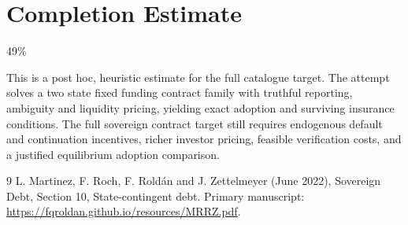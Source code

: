 \documentclass[11pt]{article}
\begin{document}
\section{Completion Estimate}
49\%

This is a post hoc, heuristic estimate for the full catalogue target.
The attempt solves a two state fixed funding contract family with truthful reporting, ambiguity and liquidity pricing, yielding exact adoption and surviving insurance conditions. The full sovereign contract target still requires endogenous default and continuation incentives, richer investor pricing, feasible verification costs, and a justified equilibrium adoption comparison.

\begin{thebibliography}{9}
 L. Martinez, F. Roch, F. Rold\'an and J. Zettelmeyer (June 2022), Sovereign Debt, Section 10, State-contingent debt. Primary manuscript:
\url{https://fqroldan.github.io/resources/MRRZ.pdf}.
\end{thebibliography}
\end{document}
